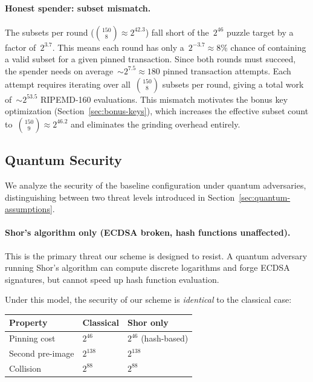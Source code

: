 \documentclass[11pt, a4paper]{article}
\begin{document}
\paragraph{Honest spender: subset mismatch.}
The subsets per round ($\binom{150}{8} \approx 2^{42.3}$) fall short of the~$2^{46}$ puzzle target by a factor of~$2^{3.7}$. This means each round has only a~$2^{-3.7} \approx 8\%$ chance of containing a valid subset for a given pinned transaction. Since both rounds must succeed, the spender needs on average~${\sim}2^{7.5} \approx 180$ pinned transaction attempts. Each attempt requires iterating over all~$\binom{150}{8}$ subsets per round, giving a total work of~${\sim}2^{53.5}$ RIPEMD-160 evaluations. This mismatch motivates the bonus key optimization (Section~\ref{sec:bonus-keys}), which increases the effective subset count to~$\binom{150}{9} \approx 2^{46.2}$ and eliminates the grinding overhead entirely.

\subsection{Quantum Security}
\label{sec:quantum-security}

We analyze the security of the baseline configuration under quantum adversaries, distinguishing between two threat levels introduced in Section~\ref{sec:quantum-assumptions}.

\paragraph{Shor's algorithm only (ECDSA broken, hash functions unaffected).}
This is the primary threat our scheme is designed to resist. A quantum adversary running Shor's algorithm can compute discrete logarithms and forge ECDSA signatures, but cannot speed up hash function evaluation.

Under this model, the security of our scheme is \emph{identical} to the classical case:

\begin{center}
\begin{tabular}{lll}
\toprule
\textbf{Property} & \textbf{Classical} & \textbf{Shor only} \\
\midrule
Pinning cost & $2^{46}$ & $2^{46}$ (hash-based) \\
Second pre-image & $2^{138}$ & $2^{138}$ \\
Collision & $2^{88}$ & $2^{88}$ \\
\bottomrule
\end{tabular}
\end{center}
\end{document}
